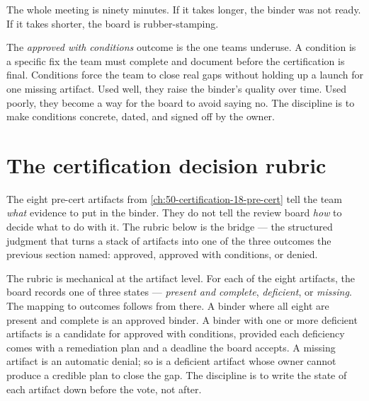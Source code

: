 The whole meeting is ninety minutes. If it takes longer, the binder was not ready. If it takes shorter, the board is rubber-stamping.

The \textit{approved with conditions} outcome is the one teams underuse. A condition is a specific fix the team must complete and document before the certification is final. Conditions force the team to close real gaps without holding up a launch for one missing artifact. Used well, they raise the binder's quality over time. Used poorly, they become a way for the board to avoid saying no. The discipline is to make conditions concrete, dated, and signed off by the owner.

\section{The certification decision rubric}

The eight pre-cert artifacts from \autoref{ch:50-certification-18-pre-cert} tell the team \textit{what} evidence to put in the binder. They do not tell the review board \textit{how} to decide what to do with it. The rubric below is the bridge --- the structured judgment that turns a stack of artifacts into one of the three outcomes the previous section named: approved, approved with conditions, or denied.

The rubric is mechanical at the artifact level. For each of the eight artifacts, the board records one of three states --- \textit{present and complete}, \textit{deficient}, or \textit{missing}. The mapping to outcomes follows from there. A binder where all eight are present and complete is an approved binder. A binder with one or more deficient artifacts is a candidate for approved with conditions, provided each deficiency comes with a remediation plan and a deadline the board accepts. A missing artifact is an automatic denial; so is a deficient artifact whose owner cannot produce a credible plan to close the gap. The discipline is to write the state of each artifact down before the vote, not after.

